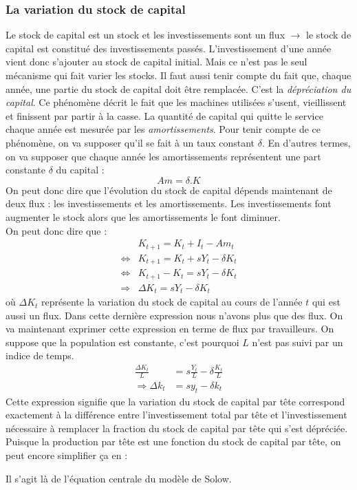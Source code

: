 \documentclass[10pt]{book}
\begin{document}
\subsubsection{La variation du stock de capital}
Le stock de capital est un stock et les investissements sont un flux $\rightarrow$ le stock de capital est constitué des investissements passés. L'investissement d'une année vient donc s'ajouter au stock de capital initial. Mais ce n'est pas le seul mécanisme qui fait varier les stocks. Il faut aussi tenir compte du fait que, chaque année, une partie du stock de capital doit être remplacée. C'est la \textit{dépréciation du capital}. Ce phénomène décrit le fait que les machines utilisées s'usent, vieillissent et finissent par partir à la casse. La quantité de capital qui quitte le service chaque année est mesurée par les \textit{amortissements}. Pour tenir compte de ce phénomène, on va supposer qu'il se fait à un taux constant $\delta$. En d'autres termes, on va supposer que chaque année les amortissements représentent une part constante $\delta$ du capital :
$$ Am = \delta .K$$ 
On peut donc dire que l'évolution du stock de capital dépends maintenant de deux flux : les investissements et les amortissements. Les investissements font augmenter  le stock alors que les amortissements le font diminuer. \\
On peut donc dire que :
\begin{align*}
 & K_{t+1}  = K_t + I_t - Am_t \\
 \Leftrightarrow & K_{t+1}  = K_t + sY_t - \delta K_t \\
 \Leftrightarrow & K_{t+1} - K_t  = sY_t - \delta K_t \\
 \Rightarrow & \Delta K_t = sY_t - \delta K_t
\end{align*}
où $\Delta K_t$ représente la variation du stock de capital au cours de l'année $t$ qui est aussi un flux. Dans cette dernière expression nous n'avons plus que des flux. On va maintenant exprimer cette expression en terme de flux par travailleurs. On suppose que la population est constante, c'est pourquoi $L$ n'est pas suivi par un indice de temps.
\begin{align*}
  \frac{\Delta K_t}{L} & = s \frac{Y_t}{L} - \delta \frac{K_t}{L} \\
  \Rightarrow \Delta k_t & = sy_t - \delta k_t
\end{align*}
Cette expression signifie que la variation du stock de capital par tête correspond exactement à la différence entre l'investissement total par tête et l'investissement nécessaire à remplacer la fraction du stock de capital par tête qui s'est dépréciée. Puisque la production par tête est une fonction du stock de capital par tête, on peut encore simplifier ça en : 
\begin{center}
\end{center}
Il s'agit là de l'équation centrale du modèle de Solow.
\end{document}
